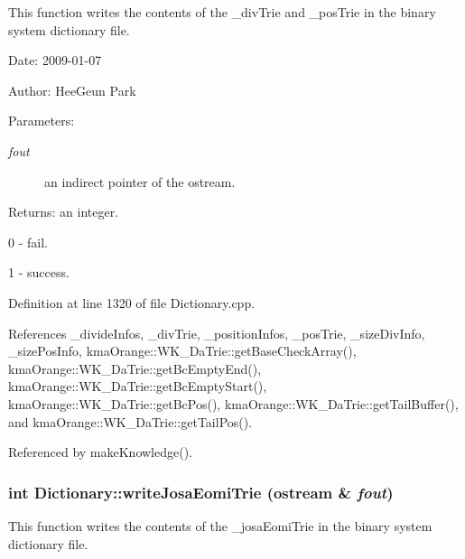 This function writes the contents of the \_\-divTrie and \_\-posTrie in the binary system dictionary file. 

\begin{Desc}
\item[Date:]2009-01-07 \end{Desc}
\begin{Desc}
\item[Author:]HeeGeun Park \end{Desc}
\begin{Desc}
\item[Parameters:]
\begin{description}
\item[{\em fout}]an indirect pointer of the ostream. \end{description}
\end{Desc}
\begin{Desc}
\item[Returns:]an integer.\par
 0 - fail.\par
 1 - success. \end{Desc}


Definition at line 1320 of file Dictionary.cpp.

References \_\-divideInfos, \_\-divTrie, \_\-positionInfos, \_\-posTrie, \_\-sizeDivInfo, \_\-sizePosInfo, kmaOrange::WK\_\-DaTrie::getBaseCheckArray(), kmaOrange::WK\_\-DaTrie::getBcEmptyEnd(), kmaOrange::WK\_\-DaTrie::getBcEmptyStart(), kmaOrange::WK\_\-DaTrie::getBcPos(), kmaOrange::WK\_\-DaTrie::getTailBuffer(), and kmaOrange::WK\_\-DaTrie::getTailPos().

Referenced by makeKnowledge().\hypertarget{classkmaOrange_1_1Dictionary_c7ea4f013545ce948c25a0fbbd221ca8}{
\subsubsection[{writeJosaEomiTrie}]{\setlength{\rightskip}{0pt plus 5cm}int Dictionary::writeJosaEomiTrie (ostream \& {\em fout})}}
\label{classkmaOrange_1_1Dictionary_c7ea4f013545ce948c25a0fbbd221ca8}


This function writes the contents of the \_\-josaEomiTrie in the binary system dictionary file. 


